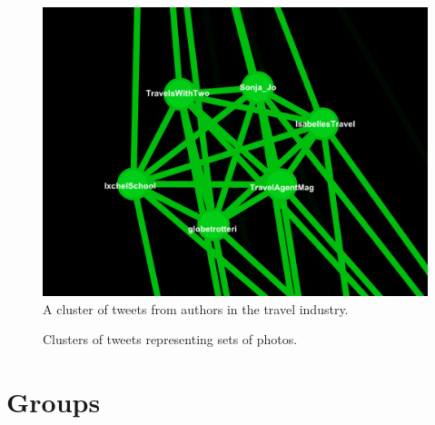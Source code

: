 \documentclass[a4paper, 11pt, titlepage]{article}
\begin{document}
\begin{figure}[h]
\centering
\label{fig:rt_net_travel}
\includegraphics[width=120mm]{../figures/rt_net_travel}
\caption{A cluster of tweets from authors in the travel industry.}
\end{figure}

\begin{figure}[h]
\centering
\label{fig:rt_net_photos}
\caption{Clusters of tweets representing sets of photos.}
\end{figure}

\section{Groups}
\end{document}
